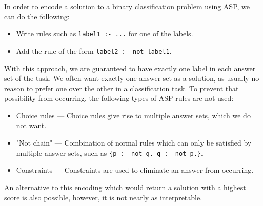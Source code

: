 In order to encode a solution to a binary classification problem using ASP, we can do the following:
\begin{itemize}
    \item Write rules such as \verb+label1 :- ...+  for one of the labels.
    \item Add the rule of the form \verb+label2 :- not label1+.
\end{itemize}

With this approach, we are guaranteed to have exactly one label in each answer set of the task.
We often want exactly one answer set as a solution, as usually no reason to prefer one over the other in a classification task.
To prevent that possibility from occurring, the following types of ASP rules are not used:
\begin{itemize}
    \item Choice rules --- Choice rules give rise to multiple answer sets, which we do not want.
    \item "Not chain" --- Combination of normal rules which can only be satisfied by multiple answer sets, such as \verb+{p :- not q. q :- not p.}+.
    \item Constraints --- Constraints are used to eliminate an answer from occurring.
\end{itemize}

An alternative to this encoding which would return a solution with a highest score is also possible, however, it is not nearly as interpretable.

